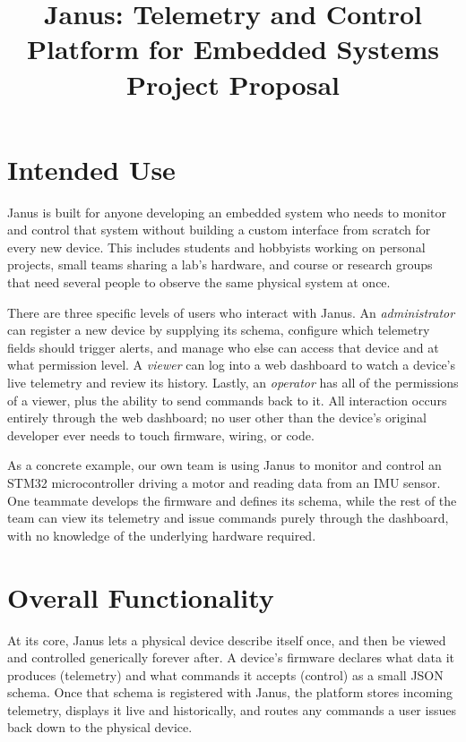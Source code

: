 \documentclass[11pt]{article}
\title{\vspace{-1.5cm}Janus: Telemetry and Control Platform for Embedded Systems\\\large Project Proposal}
\author{}
\date{}
\begin{document}
\maketitle
\vspace{-1cm}

\section*{Intended Use}

Janus is built for anyone developing an embedded system who needs to monitor and control that system without building a custom interface from scratch for every new device. This includes students and hobbyists working on personal projects, small teams sharing a lab's hardware, and course or research groups that need several people to observe the same physical system at once.

There are three specific levels of users who interact with Janus. An \emph{administrator} can register a new device by supplying its schema, configure which telemetry fields should trigger alerts, and manage who else can access that device and at what permission level. A \emph{viewer} can log into a web dashboard to watch a device's live telemetry and review its history. Lastly, an \emph{operator} has all of the permissions of a viewer, plus the ability to send commands back to it. All interaction occurs entirely through the web dashboard; no user other than the device's original developer ever needs to touch firmware, wiring, or code.

As a concrete example, our own team is using Janus to monitor and control an STM32 microcontroller driving a motor and reading data from an IMU sensor. One teammate develops the firmware and defines its schema, while the rest of the team can view its telemetry and issue commands purely through the dashboard, with no knowledge of the underlying hardware required.

\section*{Overall Functionality}

At its core, Janus lets a physical device describe itself once, and then be viewed and controlled generically forever after. A device's firmware declares what data it produces (telemetry) and what commands it accepts (control) as a small JSON schema. Once that schema is registered with Janus, the platform stores incoming telemetry, displays it live and historically, and routes any commands a user issues back down to the physical device.
\end{document}
